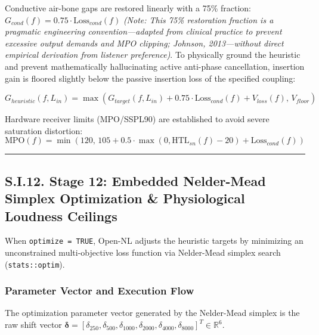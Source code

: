 \documentclass[
  12pt,
]{article}
\begin{document}
Conductive air-bone gaps are restored linearly with a 75\% fraction:
\(G_{cond}(f) = 0.75 \cdot \text{Loss}_{cond}(f)\) \emph{(Note: This
75\% restoration fraction is a pragmatic engineering
convention---adapted from clinical practice to prevent excessive output
demands and MPO clipping; Johnson, 2013---without direct empirical
derivation from listener preference)}. To physically ground the
heuristic and prevent mathematically hallucinating active anti-phase
cancellation, insertion gain is floored slightly below the passive
insertion loss of the specified coupling:

\begin{equation}
G_{heuristic}(f, L_{in}) = \max\left(G_{target}(f, L_{in}) + 0.75 \cdot \text{Loss}_{cond}(f) + V_{loss}(f),\, V_{floor}\right)
\end{equation}

Hardware receiver limits (MPO/SSPL90) are established to avoid severe
saturation distortion: \begin{equation}
\text{MPO}(f) = \min\left(120,\, 105 + 0.5 \cdot \max(0, \text{HTL}_{sn}(f) - 20) + \text{Loss}_{cond}(f)\right)
\end{equation}

\begin{center}\rule{0.5\linewidth}{0.5pt}\end{center}

\subsection{S.I.12. Stage 12: Embedded Nelder-Mead Simplex Optimization
\& Physiological Loudness
Ceilings}\label{s.i.12.-stage-12-embedded-nelder-mead-simplex-optimization-physiological-loudness-ceilings}

When \texttt{optimize\ =\ TRUE}, Open-NL adjusts the heuristic targets
by minimizing an unconstrained multi-objective loss function via
Nelder-Mead simplex search (\texttt{stats::optim}).

\subsubsection{Parameter Vector and Execution
Flow}\label{parameter-vector-and-execution-flow}

The optimization parameter vector generated by the Nelder-Mead simplex
is the raw shift vector
\(\boldsymbol{\delta} = [\delta_{250}, \delta_{500}, \delta_{1000}, \delta_{2000}, \delta_{4000}, \delta_{8000}]^T \in \mathbb{R}^6\).
\end{document}
